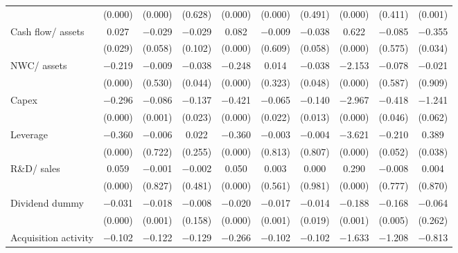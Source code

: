 \begin{longtable}{l*{9}{c}}
                    &     (0.000)&     (0.000)&     (0.628)&     (0.000)&     (0.000)&     (0.491)&     (0.000)&     (0.411)&     (0.001)\\
\addlinespace
Cash flow/ assets   &       0.027&    $-$0.029&    $-$0.029&       0.082&    $-$0.009&    $-$0.038&       0.622&    $-$0.085&    $-$0.355\\
                    &     (0.029)&     (0.058)&     (0.102)&     (0.000)&     (0.609)&     (0.058)&     (0.000)&     (0.575)&     (0.034)\\
\addlinespace
NWC/ assets         &    $-$0.219&    $-$0.009&    $-$0.038&    $-$0.248&       0.014&    $-$0.038&    $-$2.153&    $-$0.078&    $-$0.021\\
                    &     (0.000)&     (0.530)&     (0.044)&     (0.000)&     (0.323)&     (0.048)&     (0.000)&     (0.587)&     (0.909)\\
\addlinespace
Capex               &    $-$0.296&    $-$0.086&    $-$0.137&    $-$0.421&    $-$0.065&    $-$0.140&    $-$2.967&    $-$0.418&    $-$1.241\\
                    &     (0.000)&     (0.001)&     (0.023)&     (0.000)&     (0.022)&     (0.013)&     (0.000)&     (0.046)&     (0.062)\\
\addlinespace
Leverage            &    $-$0.360&    $-$0.006&       0.022&    $-$0.360&    $-$0.003&    $-$0.004&    $-$3.621&    $-$0.210&       0.389\\
                    &     (0.000)&     (0.722)&     (0.255)&     (0.000)&     (0.813)&     (0.807)&     (0.000)&     (0.052)&     (0.038)\\
\addlinespace
R\&D/ sales         &       0.059&    $-$0.001&    $-$0.002&       0.050&       0.003&       0.000&       0.290&    $-$0.008&       0.004\\
                    &     (0.000)&     (0.827)&     (0.481)&     (0.000)&     (0.561)&     (0.981)&     (0.000)&     (0.777)&     (0.870)\\
\addlinespace
Dividend dummy      &    $-$0.031&    $-$0.018&    $-$0.008&    $-$0.020&    $-$0.017&    $-$0.014&    $-$0.188&    $-$0.168&    $-$0.064\\
                    &     (0.000)&     (0.001)&     (0.158)&     (0.000)&     (0.001)&     (0.019)&     (0.001)&     (0.005)&     (0.262)\\
\addlinespace
Acquisition activity&    $-$0.102&    $-$0.122&    $-$0.129&    $-$0.266&    $-$0.102&    $-$0.102&    $-$1.633&    $-$1.208&    $-$0.813\\

\end{longtable}
